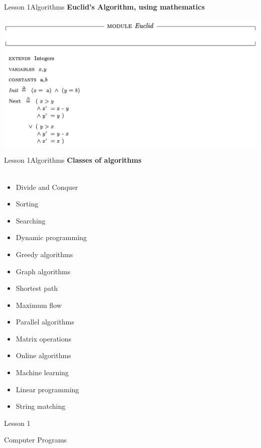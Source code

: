 \documentclass[aspectratio=1610]{beamer}
\begin{document}
\begin{frame}{Lesson 1}{Algorithms}
\Large
\textbf{Euclid's Algorithm, using mathematics}\\~\\
\includegraphics[scale=0.5]{Images/gcdtla}
\end{frame}


\begin{frame}{Lesson 1}{Algorithms}
\Large
\textbf{Classes of algorithms}\\~\\ 
    \begin{multicols}{3}
    \begin{itemize}
        \item Divide and Conquer
        \item Sorting
        \item Searching
        \item Dynamic programming
        \item Greedy algorithms
        \item Graph algorithms
        \item Shortest path
        \item Maximum flow
        \item Parallel algorithms
        \item Matrix operations
        \item Online algorithms
        \item Machine learning
        \item Linear programming
        \item String matching
    \end{itemize}
    \end{multicols}
\end{frame}



\begin{frame}{Lesson 1}{}
\begin{center}
\Huge Computer Programs
\end{center}
\end{frame}
\end{document}
